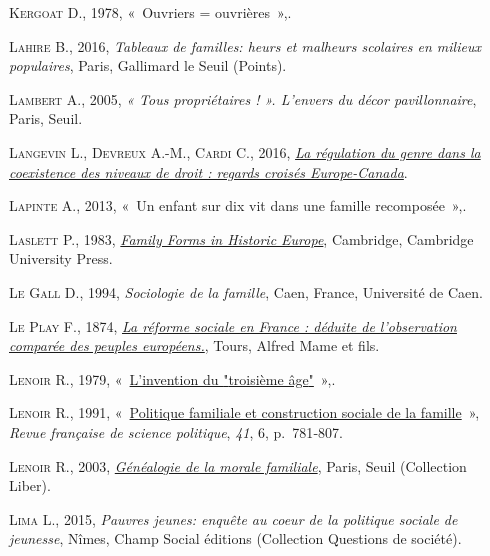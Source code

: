 \documentclass[
  12pt,
]{book}
\newlength{\cslhangindent}
\newenvironment{CSLReferences}[2] %
 {\begin{list}{}{%
  \setlength{\itemindent}{0pt}
  \setlength{\leftmargin}{0pt}
  \setlength{\parsep}{0pt}
  \ifodd #1
   \setlength{\leftmargin}{\cslhangindent}
   \setlength{\itemindent}{-1\cslhangindent}
  \fi
  \setlength{\itemsep}{#2\baselineskip}}}
 {\end{list}}
\begin{document}
\begin{CSLReferences}{0}{1}
\textsc{Kergoat D.}, 1978, {«~Ouvriers = ouvrières~»},.

\textsc{Lahire B.}, 2016, \emph{Tableaux de familles: heurs et malheurs
scolaires en milieux populaires}, Paris, Gallimard le Seuil (Points).

\textsc{Lambert A.}, 2005, \emph{« Tous propriétaires ! ». L{'}envers du
décor pavillonnaire}, Paris, Seuil.

\textsc{Langevin L.}, \textsc{Devreux A.-M.}, \textsc{Cardi C.}, 2016,
\emph{\href{https://utpjournals.press/doi/10.3138/cjwl.28.3.ix}{La
régulation du genre dans la coexistence des niveaux de droit : regards
croisés Europe-Canada}}.

\textsc{Lapinte A.}, 2013, {«~Un enfant sur dix vit dans une famille
recomposée~»},.

\textsc{Laslett P.}, 1983,
\emph{\href{https://doi.org/10.1017/CBO9780511897535}{Family Forms in
Historic Europe}}, Cambridge, Cambridge University Press.

\textsc{Le Gall D.}, 1994, \emph{Sociologie de la famille}, Caen,
France, Université de Caen.

\textsc{Le Play F.}, 1874,
\emph{\href{https://gallica.bnf.fr/ark:/12148/bpt6k209942s}{La réforme
sociale en France : déduite de l'observation comparée des peuples
européens.}}, Tours, Alfred Mame et fils.

\textsc{Lenoir R.}, 1979,
{«~\href{https://doi.org/10.3406/arss.1979.2630}{L'invention du
{"}troisième âge{"}}~»},.

\textsc{Lenoir R.}, 1991,
{«~\href{https://doi.org/10.3406/rfsp.1991.394601}{Politique familiale
et construction sociale de la famille}~»}, \emph{Revue française de
science politique}, \emph{41}, 6, p.~781‑807.

\textsc{Lenoir R.}, 2003,
\emph{\href{http://banq.pretnumerique.ca/accueil/isbn/9782021009064}{Généalogie
de la morale familiale}}, Paris, Seuil (Collection Liber).

\textsc{Lima L.}, 2015, \emph{Pauvres jeunes: enquête au coeur de la
politique sociale de jeunesse}, Nîmes, Champ Social éditions (Collection
Questions de société).


\end{CSLReferences}
\end{document}

